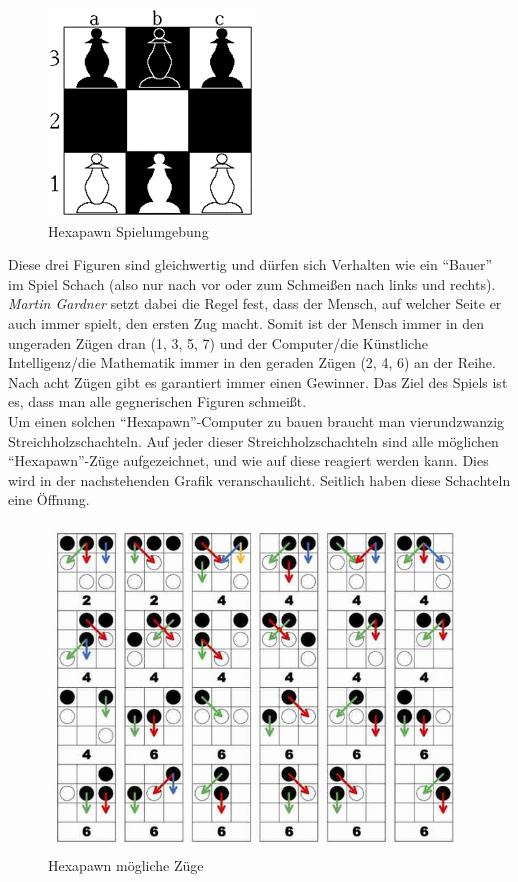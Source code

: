 \begin{figure}[H]
    \centering
    \includegraphics[scale=1]{pics/hexapawn/hexapawn_setup.png}
    \caption{Hexapawn Spielumgebung}
    \label{fig:tech:HexapawnSetup}
\end{figure}

Diese drei Figuren sind gleichwertig und dürfen sich Verhalten wie ein ``Bauer'' im Spiel Schach (also nur nach vor oder zum Schmeißen nach links und rechts). \textit{Martin Gardner} setzt dabei die Regel fest, dass der Mensch, auf welcher Seite er auch immer spielt, den ersten Zug macht. Somit ist der Mensch immer in den ungeraden Zügen dran (1, 3, 5, 7) und der Computer/die Künstliche Intelligenz/die Mathematik immer in den geraden Zügen (2, 4, 6) an der Reihe. Nach acht Zügen gibt es garantiert immer einen Gewinner. Das Ziel des Spiels ist es, dass man alle gegnerischen Figuren schmeißt.
\\
Um einen solchen ``Hexapawn''-Computer zu bauen braucht man vierundzwanzig Streichholzschachteln. Auf jeder dieser Streichholzschachteln sind alle möglichen ``Hexapawn''-Züge aufgezeichnet, und wie auf diese reagiert werden kann. Dies wird in der nachstehenden Grafik veranschaulicht. Seitlich haben diese Schachteln eine Öffnung.


\begin{figure}[H]
    \centering
    \includegraphics[scale=1]{pics/hexapawn/hexapawn_zuege.jpg}
    \caption{Hexapawn mögliche Züge}
    \label{fig:tech:HexapawnZuege}
\end{figure}



